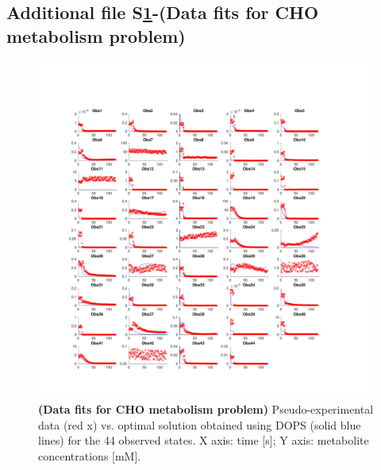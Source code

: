 \documentclass{bmcart}
\begin{document}
\begin{backmatter}
\subsection*{Additional file S\ref{fig-sims-b1}-(Data fits for CHO metabolism problem)}
\begin{figure}[ht]
\centering
\includegraphics[width=1.00\textwidth]{./rachelfigs/RecreatedFigureS1usingMS2_save.pdf}
\caption{\textbf {(Data fits for CHO metabolism problem)} Pseudo-experimental data (red x) vs. optimal solution obtained using DOPS (solid blue lines) for the 44 observed states. X axis: time [s]; Y axis: metabolite concentrations [mM].
}\label{fig-sims-b1}
\end{figure}


\end{backmatter}
\end{document}
